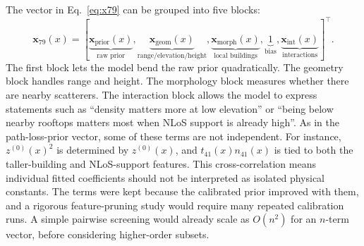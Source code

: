 The vector in Eq.~\eqref{eq:x79} can be grouped into five blocks:
\begin{equation}
\textbf{x}_{79}(x)
=
\left[
\underbrace{\textbf{x}_{\mathrm{prior}}(x)}_{\text{raw prior}},
\underbrace{\textbf{x}_{\mathrm{geom}}(x)}_{\text{range/elevation/height}},
\underbrace{\textbf{x}_{\mathrm{morph}}(x)}_{\text{local buildings}},
\underbrace{1}_{\text{bias}},
\underbrace{\textbf{x}_{\mathrm{int}}(x)}_{\text{interactions}}
\right]^{\top}.
\label{eq:x79_groups}
\end{equation}
The first block lets the model bend the raw prior quadratically. The geometry
block handles range and height. The morphology block measures whether there
are nearby scatterers. The interaction block allows the model to express
statements such as ``density matters more at low elevation'' or ``being below
nearby rooftops matters most when NLoS support is already high''.
As in the path-loss-prior vector, some of these terms are not independent.
For instance, \(z^{(0)}(x)^2\) is determined by \(z^{(0)}(x)\), and
\(t_{41}(x)n_{41}(x)\) is tied to both the taller-building and NLoS-support
features. This cross-correlation means individual fitted coefficients should
not be interpreted as isolated physical constants. The terms were kept because
the calibrated prior improved with them, and a rigorous feature-pruning study
would require many repeated calibration runs. A simple pairwise screening would
already scale as \(O(n^2)\) for an \(n\)-term vector, before considering
higher-order subsets.


